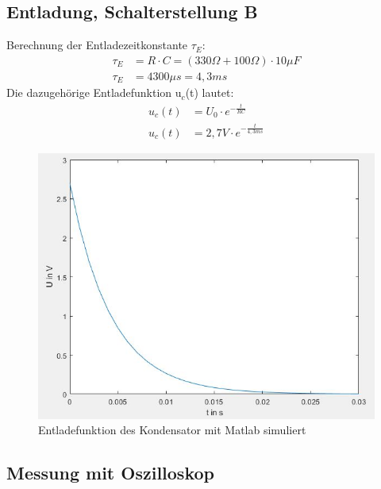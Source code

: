 \documentclass{article}
\begin{document}
 
\newpage
\subsection{Entladung, Schalterstellung B}
Berechnung der Entladezeitkonstante $\tau_E$:
\begin{align*}
    \tau_E &= R\cdot C = (330\Omega + 100\Omega) \cdot 10\mu F \\
    \tau_E &= 4300\mu s = 4,3ms
\end{align*}
Die dazugehörige Entladefunktion u$_c$(t) lautet:
\begin{align*}
    u_c(t)&= U_0 \cdot e^{-\frac{t}{RC}}\\
    u_c(t)&= 2,7V \cdot e^{-\frac{t}{4,3ms}}
\end{align*}

\begin{figure}[h]
  \begin{center}
    \includegraphics[scale=0.6]{../assets/images/ET2P4/entladefunktion.JPG}
    \caption{Entladefunktion des Kondensator mit Matlab simuliert}
  \end{center}
\end{figure}

\newpage
\subsection{Messung mit Oszilloskop}
\end{document}
